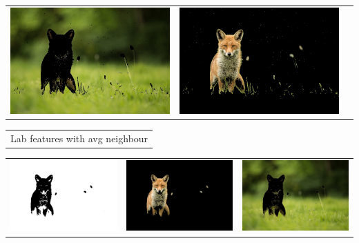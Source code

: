\documentclass{article}
\begin{document}
\begin{center}
\begin{tabular}{c c c}
 \includegraphics[width=.4\linewidth]{../image-segmentation/output/add-Lab-neighbor-diff-feature/fox_seg1.jpg} & \includegraphics[width=.4\linewidth]{../image-segmentation/output/add-Lab-neighbor-diff-feature/fox_seg2.jpg} \\
  
 \end{tabular}
 \begin{tabular}{c}

Lab features with avg neighbour \\
\end{tabular}
 \begin{tabular}{c c c} 

 \includegraphics[width=.4\linewidth]{../image-segmentation/output/add-Lab-neighbor-avg-feature/fox_mask.jpg} & 
 
 \includegraphics[width=.4\linewidth]{../image-segmentation/output/add-Lab-neighbor-avg-feature/fox_seg1.jpg} & \includegraphics[width=.4\linewidth]{../image-segmentation/output/add-Lab-neighbor-avg-feature/fox_seg2.jpg} \\
  
 \end{tabular}
 
 
\end{center}
\end{document}
